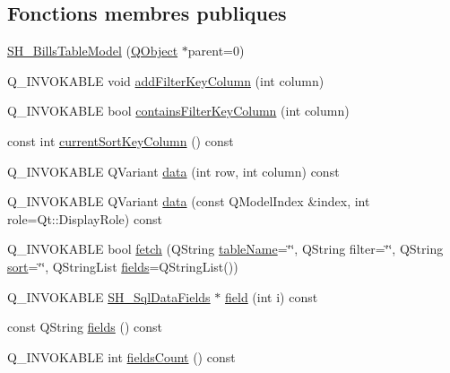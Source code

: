 \subsection*{Fonctions membres publiques}
\begin{DoxyCompactItemize}
\item 
\hyperlink{classSH__BillsTableModel_ab93c4113bb4f81833f9a3b7d9365ed3f}{S\-H\-\_\-\-Bills\-Table\-Model} (\hyperlink{classQObject}{Q\-Object} $\ast$parent=0)
\item 
Q\-\_\-\-I\-N\-V\-O\-K\-A\-B\-L\-E void \hyperlink{classSH__ExtendedProxyModel_a4e98e24b6b94adf31a2c5e935a48f831}{add\-Filter\-Key\-Column} (int column)
\item 
Q\-\_\-\-I\-N\-V\-O\-K\-A\-B\-L\-E bool \hyperlink{classSH__ExtendedProxyModel_a865da9bd795526dc63b8c6447d59cfc0}{contains\-Filter\-Key\-Column} (int column)
\item 
const int \hyperlink{classSH__ExtendedProxyModel_a76786ad4b81dbd521a610c2f6f973a96}{current\-Sort\-Key\-Column} () const 
\item 
Q\-\_\-\-I\-N\-V\-O\-K\-A\-B\-L\-E Q\-Variant \hyperlink{classSH__ExtendedProxyModel_aca6cc510f740e847e0cfc06e0adb5771}{data} (int row, int column) const 
\item 
Q\-\_\-\-I\-N\-V\-O\-K\-A\-B\-L\-E Q\-Variant \hyperlink{classSH__ExtendedProxyModel_afbc947efbe1107fc5bf8926c52902a1c}{data} (const Q\-Model\-Index \&index, int role=Qt\-::\-Display\-Role) const 
\item 
Q\-\_\-\-I\-N\-V\-O\-K\-A\-B\-L\-E bool \hyperlink{classSH__ExtendedProxyModel_a64f684a4a7d35925ff4f4b81984da60e}{fetch} (Q\-String \hyperlink{classSH__ExtendedProxyModel_aba6e6f8bbde17ea533de3e9a127c804a}{table\-Name}=\char`\"{}\char`\"{}, Q\-String filter=\char`\"{}\char`\"{}, Q\-String \hyperlink{classSH__ExtendedProxyModel_a5ed9b14df78667efe8b22d19617d6c4b}{sort}=\char`\"{}\char`\"{}, Q\-String\-List \hyperlink{classSH__ExtendedProxyModel_addbd48beef730fe7adfaffcaca8b256a}{fields}=Q\-String\-List())
\item 
Q\-\_\-\-I\-N\-V\-O\-K\-A\-B\-L\-E \hyperlink{classSH__SqlDataFields}{S\-H\-\_\-\-Sql\-Data\-Fields} $\ast$ \hyperlink{classSH__ExtendedProxyModel_ac73fae31c6ad69663b4df97f65ec945f}{field} (int i) const 
\item 
const Q\-String \hyperlink{classSH__ExtendedProxyModel_addbd48beef730fe7adfaffcaca8b256a}{fields} () const 
\item 
Q\-\_\-\-I\-N\-V\-O\-K\-A\-B\-L\-E int \hyperlink{classSH__ExtendedProxyModel_a5a5e6b84a9a397e096f4404cec5e9e0c}{fields\-Count} () const 

\end{DoxyCompactItemize}
